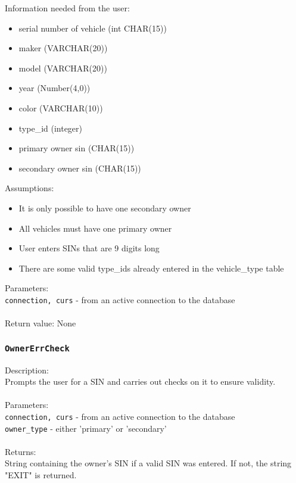 \documentclass[12pt]{article}
\begin{document}
Information needed from the user:
\begin{itemize}
\item serial number of vehicle (int CHAR(15))
\item maker (VARCHAR(20))
\item model (VARCHAR(20))
\item year (Number(4,0))
\item color (VARCHAR(10))
\item type\_id (integer)
\item primary owner sin (CHAR(15))
\item secondary owner sin (CHAR(15)) 
\end{itemize}

\noindent Assumptions:
\begin{itemize}
\item It is only possible to have one secondary owner
\item All vehicles must have one primary owner
\item User enters SINs that are 9 digits long
\item There are some valid type\_ids already entered in the 
      vehicle\_type table
\end{itemize}
Parameters:\\
\indent \texttt{connection, curs} - from an active connection to the database\\\\
Return value: None
\subsubsection{\texttt{OwnerErrCheck}}
Description: \\
\indent Prompts the user for a SIN and carries out checks on it to ensure validity.\\\\
\noindent Parameters: \\
\indent\texttt{connection, curs} - from an active connection to the database\\
\indent\texttt{owner\_type} - either 'primary' or 'secondary'\\\\
Returns: \\
\indent String containing the owner's SIN if a valid SIN was entered. If not, the string "EXIT" is returned.
\end{document}
